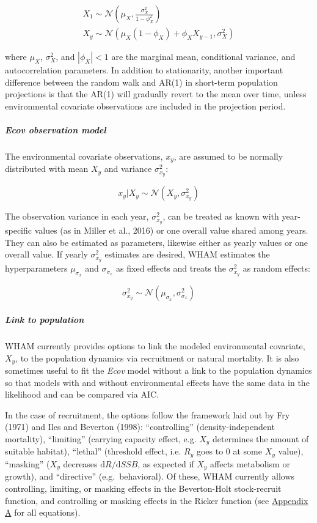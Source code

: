 \documentclass[]{article}
\let\oldsubparagraph\subparagraph
\renewcommand{\subparagraph}[1]{\oldsubparagraph{#1}\mbox{}}
\begin{document}
\begin{equation}
  \begin{array}{cc}
    X_1 \sim \mathcal{N} \left( \mu_X, \frac{\sigma^2_X}{1-\phi^2_X} \right) \\
    X_y \sim \mathcal{N} \left( \mu_X(1-\phi_X) + \phi_X X_{y-1}, \sigma^2_X \right)
  \end{array}
\end{equation}

where \(\mu_X\), \(\sigma^2_X\), and \(|\phi_X| < 1\) are the marginal
mean, conditional variance, and autocorrelation parameters. In addition
to stationarity, another important difference between the random walk
and AR(1) in short-term population projections is that the AR(1) will
gradually revert to the mean over time, unless environmental covariate
observations are included in the projection period.

\hypertarget{ecov-observation-model}{%
\subparagraph{\texorpdfstring{\emph{Ecov} observation
model}{Ecov observation model}}\label{ecov-observation-model}}

The environmental covariate observations, \(x_y\), are assumed to be
normally distributed with mean \(X_y\) and variance \(\sigma^2_{x_y}\):

\[x_y | X_y \sim \mathcal{N}\left( X_y, \sigma^2_{x_y} \right)\]

The observation variance in each year, \(\sigma^2_{x_y}\), can be
treated as known with year-specific values (as in Miller et al., 2016)
or one overall value shared among years. They can also be estimated as
parameters, likewise either as yearly values or one overall value. If
yearly \(\sigma^2_{x_y}\) estimates are desired, WHAM estimates the
hyperparameters \(\mu_{\sigma_x}\) and \(\sigma_{\sigma_x}\) as fixed
effects and treats the \(\sigma^2_{x_y}\) as random effects:

\[\sigma^2_{x_y} \sim \mathcal{N} \left( \mu_{\sigma_x}, \sigma^2_{\sigma_x} \right)\]

\hypertarget{link-to-population}{%
\subparagraph{Link to population}\label{link-to-population}}

WHAM currently provides options to link the modeled environmental
covariate, \(X_y\), to the population dynamics via recruitment or
natural mortality. It is also sometimes useful to fit the \emph{Ecov}
model without a link to the population dynamics so that models with and
without environmental effects have the same data in the likelihood and
can be compared via AIC.

In the case of recruitment, the options follow the framework laid out by
Fry (1971) and Iles and Beverton (1998): ``controlling''
(density-independent mortality), ``limiting'' (carrying capacity effect,
e.g. \(X_y\) determines the amount of suitable habitat), ``lethal''
(threshold effect, i.e. \(R_y\) goes to 0 at some \(X_y\) value),
``masking'' (\(X_y\) decreases \(\text{d}R/\text{d}SSB\), as expected if
\(X_y\) affects metabolism or growth), and ``directive''
(e.g.~behavioral). Of these, WHAM currently allows controlling,
limiting, or masking effects in the Beverton-Holt stock-recruit
function, and controlling or masking effects in the Ricker function (see
\protect\hyperlink{appendix-a}{Appendix A} for all equations).
\end{document}

